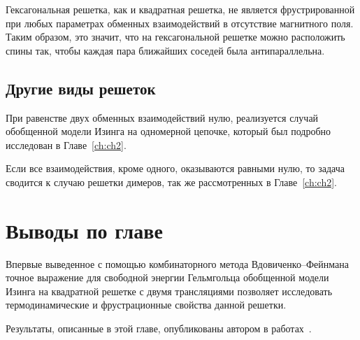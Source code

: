 Гексагональная решетка, как и квадратная решетка, не является фрустрированной при любых параметрах обменных взаимодействий в отсутствие магнитного поля. Таким образом, это значит, что на гексагональной решетке можно расположить спины так, чтобы каждая пара ближайших соседей была антипараллельна.

\subsection{Другие виды решеток}

При равенстве двух обменных взаимодействий нулю, реализуется случай обобщенной модели Изинга на одномерной цепочке, который был подробно исследован в Главе~\ref{ch:ch2}.

Если все взаимодействия, кроме одного, оказываются равными нулю, то задача сводится к случаю решетки димеров, так же рассмотренных в Главе~\ref{ch:ch2}.


\section{Выводы по главе}

Впервые выведенное с помощью комбинаторного метода Вдовиченко--Фейнмана точное выражение для свободной энергии Гельмгольца обобщенной модели Изинга на квадратной решетке с двумя трансляциями позволяет исследовать термодинамические и фрустрационные свойства данной решетки.

Результаты, описанные в этой главе, опубликованы автором в работах~\cite{confbib7, confbib8, scbib2}.

\FloatBarrier